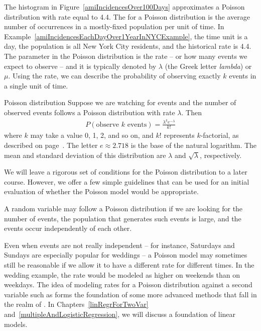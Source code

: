 The histogram in Figure~\ref{amiIncidencesOver100Days} approximates a Poisson distribution with rate equal to 4.4. The  for a Poisson distribution is the average number of occurrences in a mostly-fixed population per unit of time. In Example~\ref{amiIncidencesEachDayOver1YearInNYCExample}, the time unit is a day, the population is all New York City residents, and the historical rate is 4.4. The parameter in the Poisson distribution is the rate -- or how many events we expect to observe -- and it is typically denoted by $\lambda$
(the Greek letter \emph{lambda})  or $\mu$. Using the rate, we can describe the probability of observing exactly $k$ events in a single unit of time.

\begin{onebox}{Poisson distribution}
  Suppose we are watching for events and the number
  of observed events follows a Poisson distribution
  with rate $\lambda$.
  Then
  \begin{align*}
  P(\text{observe $k$ events})
      = \frac{\lambda^{k} e^{-\lambda}}{k!}
  \end{align*}
  where $k$ may take a value 0, 1, 2, and so on,
  and $k!$ represents $k$-factorial, as described on
  page~\pageref{factorialDefinitionInTheBinomialSection}.
  The letter $e\approx2.718$ is the base of the natural
  logarithm.
  The mean and standard deviation of this distribution
  are $\lambda$ and $\sqrt{\lambda}$, respectively.
\end{onebox}

We will leave a rigorous set of conditions for the Poisson distribution to a later course. However, we offer a few simple guidelines that can be used for an initial evaluation of whether the Poisson model would be appropriate.

A random variable may follow a Poisson distribution if we are looking for the number of events, the population that generates such events is large, and the events occur independently of each other.

Even when events are not really independent -- for instance, Saturdays and Sundays are especially popular for weddings -- a Poisson model may sometimes still be reasonable if we allow it to have a different rate for different times. In the wedding example, the rate would be modeled as higher on weekends than on weekdays. The idea of modeling rates for a Poisson distribution against a second variable such as  forms the foundation of some more advanced methods that fall in the realm of . In Chapters~\ref{linRegrForTwoVar} and~\ref{multipleAndLogisticRegression}, we will discuss a foundation of linear models.



